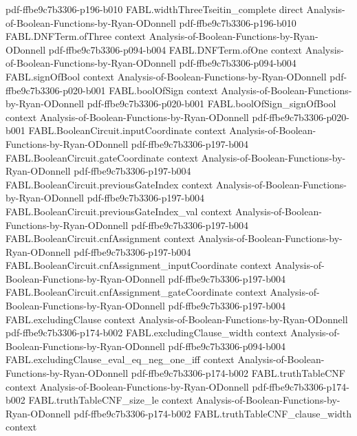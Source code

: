 \begin{theorem}
  {pdf-ffbe9c7b3306-p196-b010}
\proofstep
  {FABL.widthThreeTseitin_complete}
  {direct}
  {Analysis-of-Boolean-Functions-by-Ryan-ODonnell}
  {pdf-ffbe9c7b3306-p196-b010}
\proofstep
  {FABL.DNFTerm.ofThree}
  {context}
  {Analysis-of-Boolean-Functions-by-Ryan-ODonnell}
  {pdf-ffbe9c7b3306-p094-b004}
\proofstep
  {FABL.DNFTerm.ofOne}
  {context}
  {Analysis-of-Boolean-Functions-by-Ryan-ODonnell}
  {pdf-ffbe9c7b3306-p094-b004}
\proofstep
  {FABL.signOfBool}
  {context}
  {Analysis-of-Boolean-Functions-by-Ryan-ODonnell}
  {pdf-ffbe9c7b3306-p020-b001}
\proofstep
  {FABL.boolOfSign}
  {context}
  {Analysis-of-Boolean-Functions-by-Ryan-ODonnell}
  {pdf-ffbe9c7b3306-p020-b001}
\proofstep
  {FABL.boolOfSign_signOfBool}
  {context}
  {Analysis-of-Boolean-Functions-by-Ryan-ODonnell}
  {pdf-ffbe9c7b3306-p020-b001}
\proofstep
  {FABL.BooleanCircuit.inputCoordinate}
  {context}
  {Analysis-of-Boolean-Functions-by-Ryan-ODonnell}
  {pdf-ffbe9c7b3306-p197-b004}
\proofstep
  {FABL.BooleanCircuit.gateCoordinate}
  {context}
  {Analysis-of-Boolean-Functions-by-Ryan-ODonnell}
  {pdf-ffbe9c7b3306-p197-b004}
\proofstep
  {FABL.BooleanCircuit.previousGateIndex}
  {context}
  {Analysis-of-Boolean-Functions-by-Ryan-ODonnell}
  {pdf-ffbe9c7b3306-p197-b004}
\proofstep
  {FABL.BooleanCircuit.previousGateIndex_val}
  {context}
  {Analysis-of-Boolean-Functions-by-Ryan-ODonnell}
  {pdf-ffbe9c7b3306-p197-b004}
\proofstep
  {FABL.BooleanCircuit.cnfAssignment}
  {context}
  {Analysis-of-Boolean-Functions-by-Ryan-ODonnell}
  {pdf-ffbe9c7b3306-p197-b004}
\proofstep
  {FABL.BooleanCircuit.cnfAssignment_inputCoordinate}
  {context}
  {Analysis-of-Boolean-Functions-by-Ryan-ODonnell}
  {pdf-ffbe9c7b3306-p197-b004}
\proofstep
  {FABL.BooleanCircuit.cnfAssignment_gateCoordinate}
  {context}
  {Analysis-of-Boolean-Functions-by-Ryan-ODonnell}
  {pdf-ffbe9c7b3306-p197-b004}
\proofstep
  {FABL.excludingClause}
  {context}
  {Analysis-of-Boolean-Functions-by-Ryan-ODonnell}
  {pdf-ffbe9c7b3306-p174-b002}
\proofstep
  {FABL.excludingClause_width}
  {context}
  {Analysis-of-Boolean-Functions-by-Ryan-ODonnell}
  {pdf-ffbe9c7b3306-p094-b004}
\proofstep
  {FABL.excludingClause_eval_eq_neg_one_iff}
  {context}
  {Analysis-of-Boolean-Functions-by-Ryan-ODonnell}
  {pdf-ffbe9c7b3306-p174-b002}
\proofstep
  {FABL.truthTableCNF}
  {context}
  {Analysis-of-Boolean-Functions-by-Ryan-ODonnell}
  {pdf-ffbe9c7b3306-p174-b002}
\proofstep
  {FABL.truthTableCNF_size_le}
  {context}
  {Analysis-of-Boolean-Functions-by-Ryan-ODonnell}
  {pdf-ffbe9c7b3306-p174-b002}
\proofstep
  {FABL.truthTableCNF_clause_width}
  {context}

\end{theorem}
